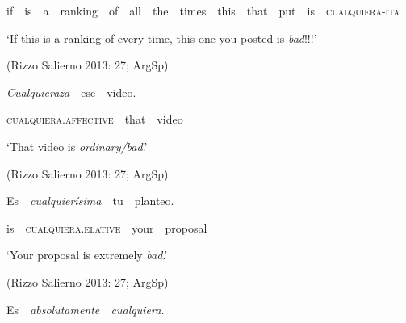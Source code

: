 \begin{styleStandard}
\ \ if\ \ is\ \ a\ \ ranking\ \ of\ \ all\ \ the\ \ times\ \ this\ \ that\ \ put\ \ is\ \ \textsc{cualquiera-ita}
\end{styleStandard}

\begin{styleStandard}
\ \ ‘If this is a ranking of every time, this one you posted is \textit{bad}!!!’
\end{styleStandard}

\begin{styleStandard}
\ \ (Rizzo Salierno 2013: 27; ArgSp)
\end{styleStandard}

\begin{styleStandard}
\ \ \textit{Cualquieraza}\ \ ese\ \ video.
\end{styleStandard}

\begin{styleStandard}
\ \ \textsc{cualquiera}.\textsc{affective}\ \ that\ \ video
\end{styleStandard}

\begin{styleStandard}
\ \ ‘That video is \textit{ordinary/bad}.’
\end{styleStandard}

\begin{styleStandard}
\ \ (Rizzo Salierno 2013: 27; ArgSp)
\end{styleStandard}

\begin{styleStandard}
\ \ Es\ \ \textit{cualquierísima\ \ }tu\ \ planteo.
\end{styleStandard}

\begin{styleStandard}
\ \ is\ \ \textsc{cualquiera}.\textsc{elative}\ \ your\ \ proposal
\end{styleStandard}

\begin{styleStandard}
\ \ ‘Your proposal is extremely \textit{bad}.’
\end{styleStandard}

\begin{styleStandard}
\ \ (Rizzo Salierno 2013: 27; ArgSp)
\end{styleStandard}

\begin{styleStandard}
\ \ Es\ \ \textit{absolutamente\ \ cualquiera.\ \ }
\end{styleStandard}

